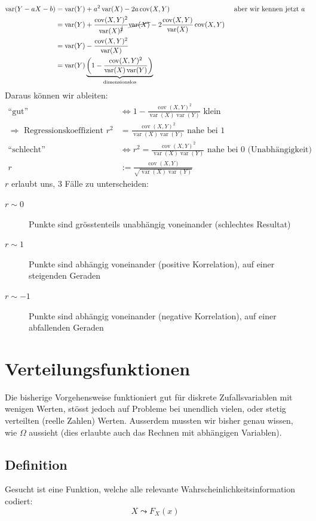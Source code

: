 \documentclass[10pt,a4paper]{scrartcl}
\DeclareMathOperator{\var}{var}
\DeclareMathOperator{\cov}{cov}
\begin{document}
\begin{align*}
\var(Y-aX-b) & = \var(Y) + a^2\var(X) - 2a\cov(X, Y) & \text{ aber wir kennen jetzt } a\\
             & = \var(Y) + \frac{\cov(X, Y)^2}{\var(X)^{\cancel{2}}}\cancel{\var(X)} - 2\frac{\cov(X, Y)}{\var(X)} \cov(X,Y) \\
             & = \var(Y) - \frac{\cov(X, Y)^2}{\var(X)}\\
             & = \var(Y) \underbrace{\left(1 - \frac{\cov(X,Y)^2}{\var(X)\var(Y)}\right)}_{\text{dimensionslos}}
\end{align*}
Daraus können wir ableiten:
\begin{align*}
\text{``gut''} & \Leftrightarrow 1 - \frac{\cov(X,Y)^2}{\var(X)\var(Y)} \text{ klein} \\
               \Rightarrow \text{ Regressionskoeffizient } r^2 & = \frac{\cov(X,Y)^2}{\var(X)\var(Y)} \text{ nahe bei } 1 \\
\text{``schlecht''} & \Leftrightarrow r^2 = \frac{\cov(X,Y)^2}{\var(X)\var(Y)} \text{ nahe bei } 0 \text{ (Unabhängigkeit)} \\
r & := \frac{\cov(X,Y)}{\sqrt{\var(X)\var(Y)}}
\end{align*}
$r$ erlaubt uns, 3 Fälle zu unterscheiden:
\begin{description}
\item[$r\sim 0$] Punkte sind grösstenteils unabhängig voneinander (schlechtes Resultat)
\item[$r\sim 1$] Punkte sind abhängig voneinander (positive Korrelation), auf einer steigenden Geraden
\item[$r\sim -1$] Punkte sind abhängig voneinander (negative Korrelation), auf einer abfallenden Geraden
\end{description}

\section{Verteilungsfunktionen}
Die bisherige Vorgehensweise funktioniert gut für diskrete Zufallsvariablen mit wenigen Werten, stösst jedoch auf Probleme bei unendlich vielen, oder stetig verteilten (reelle Zahlen) Werten. Ausserdem mussten wir bisher genau wissen, wie $\Omega$ aussieht (dies erlaubte auch das Rechnen mit abhängigen Variablen).

\subsection{Definition}
Gesucht ist eine Funktion, welche alle relevante Wahrscheinlichkeitsinformation codiert:
$$X \leadsto F_X(x)$$
\end{document}
